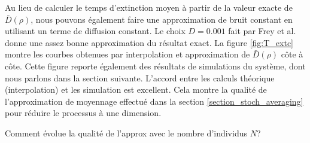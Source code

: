 \documentclass[openany,a4paper,12pt]{article}
\begin{document}
\par Au lieu de calculer le temps d'extinction moyen à partir de la valeur exacte de $\bar D(\rho)$, nous pouvons également faire une approximation de bruit constant en utilisant un terme de diffusion constant. Le choix $D=0.001$ fait par Frey et al. \cite{frey2012} donne une assez bonne approximation du résultat exact. La figure \ref{fig:T_extc} montre les courbes obtenues par interpolation et approximation de $\bar D(\rho)$ côte à côte. Cette figure reporte également des résultats de simulations du système, dont nous parlons dans la section suivante. L'accord entre les calculs théorique (interpolation) et les simulation est excellent. Cela montre la qualité de l'approximation de moyennage effectué dans la section \ref{section_stoch_averaging} pour réduire le processus à une dimension.

{\color{red} Comment évolue la qualité de l'approx avec le nombre d'individus $N$?}

\end{document}
